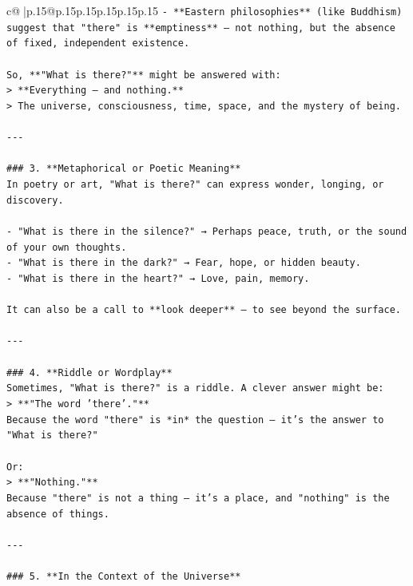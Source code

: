 \documentclass{article}
\begin{document}
{\begin{supertabular}{c@{$\;$}|p{.15\linewidth}@{}p{.15\linewidth}p{.15\linewidth}p{.15\linewidth}p{.15\linewidth}p{.15\linewidth}}
{{{\texttt{{-} **Eastern philosophies** (like Buddhism) suggest that "there" is **emptiness** — not nothing, but the absence of fixed, independent existence.} \\
\\ 
\texttt{So, **"What is there?"** might be answered with:} \\
\texttt{> **Everything — and nothing.**  } \\
\texttt{> The universe, consciousness, time, space, and the mystery of being.} \\
\\ 
\texttt{{-}{-}{-}} \\
\\ 
\texttt{\#\#\# 3. **Metaphorical or Poetic Meaning**} \\
\texttt{In poetry or art, "What is there?" can express wonder, longing, or discovery.} \\
\\ 
\texttt{{-} "What is there in the silence?" → Perhaps peace, truth, or the sound of your own thoughts.} \\
\texttt{{-} "What is there in the dark?" → Fear, hope, or hidden beauty.} \\
\texttt{{-} "What is there in the heart?" → Love, pain, memory.} \\
\\ 
\texttt{It can also be a call to **look deeper** — to see beyond the surface.} \\
\\ 
\texttt{{-}{-}{-}} \\
\\ 
\texttt{\#\#\# 4. **Riddle or Wordplay**} \\
\texttt{Sometimes, "What is there?" is a riddle. A clever answer might be:} \\
\texttt{> **"The word 'there'."**  } \\
\texttt{Because the word "there" is *in* the question — it’s the answer to "What is there?"} \\
\\ 
\texttt{Or:} \\
\texttt{> **"Nothing."**  } \\
\texttt{Because "there" is not a thing — it’s a place, and "nothing" is the absence of things.} \\
\\ 
\texttt{{-}{-}{-}} \\
\\ 
\texttt{\#\#\# 5. **In the Context of the Universe**} \\
}}}
\end{supertabular}}
\end{document}
